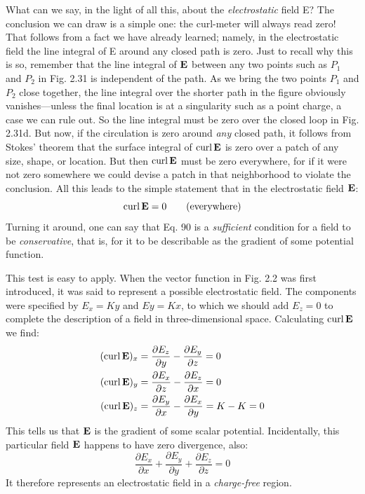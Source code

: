 What can we say, in the light of all this, about the \emph{electrostatic}
field E? The conclusion we can draw is a simple one: the curl-meter
will always read zero! That follows from a fact we have already
learned; namely, in the electrostatic field the line integral of E
around any closed path is zero. Just to recall why this is so, remember
that the line integral of $\mathbf{E}$ between any two points such as $P_1$ and
$P_2$ in Fig. 2.31 is independent of the path. As we bring the two points
$P_1$ and $P_2$ close together, the line integral over the shorter path in the
figure obviously vanishes---unless the final location is at a singularity
such as a point charge, a case we can rule out. So the line integral
must be zero over the closed loop in Fig. 2.31d. But now, if the circulation
is zero around \emph{any} closed path, it follows from Stokes'
theorem that the surface integral of $\operatorname{curl}\mathbf{E}$ is zero over a patch of any
size, shape, or location. But then $\operatorname{curl}\mathbf{E}$ must be zero everywhere,
for if it were not zero somewhere we could devise a patch in that
neighborhood to violate the conclusion. All this leads to the simple
statement that in the electrostatic field $\mathbf{E}$:
\begin{equation}
  \operatorname{curl}\mathbf{E} = 0 \qquad (\text{everywhere})
\end{equation}
Turning it around, one can say that Eq. 90 is a \emph{sufficient} condition for
a field to be \emph{conservative}, that is, for it to be describable as the gradient
of some potential function.

This test is easy to apply. When the vector function in Fig. 2.2
was first introduced, it was said to represent a possible electrostatic
field. The components were specified by $E_x = Ky$ and $Ey = Kx$, to
which we should add $E_z=0$ to complete the description of a field
in three-dimensional space. Calculating $\operatorname{curl}\mathbf{E}$ we find:
\begin{align}
\begin{split}
  (\operatorname{curl} \mathbf{E})_x &= \frac{\partial E_z}{\partial y} - \frac{\partial E_y}{\partial z} = 0 \\
  (\operatorname{curl} \mathbf{E})_y &= \frac{\partial E_x}{\partial z} - \frac{\partial E_z}{\partial x} = 0 \\
  (\operatorname{curl} \mathbf{E})_z &= \frac{\partial E_y}{\partial x} - \frac{\partial E_x}{\partial y} = K-K = 0 \\
\end{split}
\end{align}
This tells us that $\mathbf{E}$ is the gradient of some scalar potential. Incidentally,
this particular field $\mathbf{E}$ happens to have zero divergence, also:
\begin{equation}
  \frac{\partial E_x}{\partial x}+\frac{\partial E_y}{\partial y}+\frac{\partial E_z}{\partial z} = 0
\end{equation}
It therefore represents an electrostatic field in a \emph{charge-free} region.

